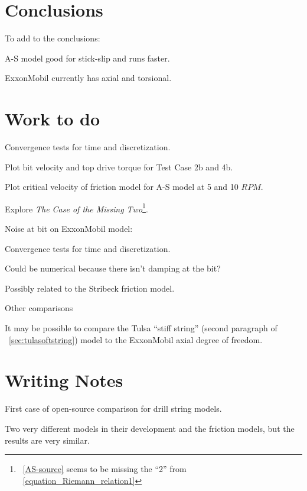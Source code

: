 \section{Conclusions}
To add to the conclusions:
\begin{bulletedlist}
	\item A-S model good for stick-slip and runs faster.
	\item ExxonMobil currently has axial and torsional.
\end{bulletedlist}

\section{Work to do}
\begin{bulletedlist}
	\item Convergence tests for time and discretization.
	\item Plot bit velocity and top drive torque for Test Case 2b and 4b.
	\item Plot critical velocity of friction model for A-S model at 5 and 10 $RPM$.
	\item Explore \emph{The Case of the Missing Two}\footnote{\equationname~\ref{AS-source} seems to be missing the ``2'' from \equationname~\ref{equation_Riemann_relation1}}.

\end{bulletedlist}

\noindent Noise at bit on ExxonMobil model:
\begin{bulletedlist}
	\item Convergence tests for time and discretization.
	\item Could be numerical because there isn't damping at the bit?
	\item Possibly related to the Stribeck friction model.
\end{bulletedlist}

\noindent Other comparisons
\begin{bulletedlist}
	\item It may be possible to compare the Tulsa ``stiff string'' (second paragraph of \sectionname~\ref{sec:tulasoftstring}) model to the ExxonMobil axial degree of freedom.
\end{bulletedlist}



\section{Writing Notes}
\begin{bulletedlist}
	\item First case of open-source comparison for drill string models.
	\item Two very different models in their development and the friction models, but the results are very similar.
\end{bulletedlist}

